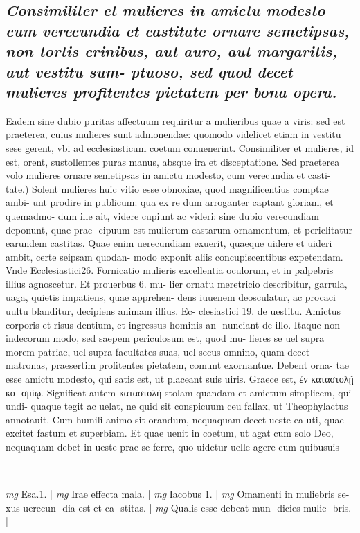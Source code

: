 \documentclass{article}
\begin{document}
\begin{pages}
\subsection*{\textit{Consimiliter et mulieres in amictu modesto cum verecundia et castitate ornare semetipsas, non tortis crinibus, aut auro, aut margaritis, aut vestitu sum- ptuoso, sed quod decet mulieres profitentes pietatem per bona opera. }}\pstart Eadem sine dubio puritas affectuum requiritur a mulieribus quae a viris: sed est praeterea, cuius mulieres sunt admonendae: quomodo videlicet etiam in vestitu sese gerent, vbi ad ecclesiasticum coetum conuenerint. Consimiliter et mulieres, id est, orent, sustollentes puras manus, absque  ira et disceptatione.  \pend\pstart Sed praeterea volo mulieres ornare semetipsas in amictu modesto, cum verecundia et casti- tate.) Solent mulieres huic vitio esse obnoxiae, quod magnificentius comptae ambi- unt prodire in publicum: qua ex re dum arroganter captant gloriam, et quemadmo- dum ille ait, videre cupiunt ac videri: sine dubio verecundiam deponunt, quae prae- cipuum est mulierum castarum ornamentum, et periclitatur earundem castitas. Quae enim uerecundiam exuerit, quaeque  uidere et uideri ambit, certe seipsam quodan- modo exponit aliis concupiscentibus expetendam. Vnde Ecclesiastici26. Fornicatio mulieris excellentia oculorum, et in palpebris illius agnoscetur. Et prouerbus 6. mu- lier ornatu meretricio describitur, garrula, uaga, quietis impatiens, quae apprehen- dens iuuenem deosculatur, ac procaci uultu blanditur, decipiens animam illius. Ec- clesiastici 19. de uestitu. Amictus corporis et risus dentium, et ingressus hominis an- nunciant de illo. Itaque  non indecorum modo, sed saepem periculosum est, quod mu- lieres se uel supra morem patriae, uel supra facultates suas, uel secus omnino, quam decet matronas, praesertim profitentes pietatem, comunt exornantue. Debent orna- tae esse amictu modesto, qui satis est, ut placeant suis uiris. Graece est, ἐν καταστολῇ κο- σμίῳ. Significat autem καταστολὴ stolam quandam et amictum simplicem, qui undi- quaque tegit ac uelat, ne quid sit conspicuum ceu fallax, ut Theophylactus annotauit. Cum humili animo sit orandum, nequaquam decet ueste ea uti, quae excitet fastum et superbiam. Et quae uenit in coetum, ut agat cum solo Deo, nequaquam debet in ueste prae se ferre, quo uidetur uelle agere cum quibusuis  \pend
\vspace{0.5cm}\noindent
\vspace{0.2cm}\rule{1cm}{0.2pt}\\ 
\hspace{0.2cm}\textit{mg}
\footnotesize Esa.1. 
\normalsize| 
\hspace{0.2cm}\textit{mg}
\footnotesize Irae effecta mala. 
\normalsize| 
\hspace{0.2cm}\textit{mg}
\footnotesize Iacobus 1. 
\normalsize| 
\hspace{0.2cm}\textit{mg}
\footnotesize Omamenti in muliebris se- xus uerecun- dia est et ca- stitas. 
\normalsize| 
\hspace{0.2cm}\textit{mg}
\footnotesize Qualis esse debeat mun- dicies mulie- bris. 
\normalsize| 

\end{pages}
\end{document}
